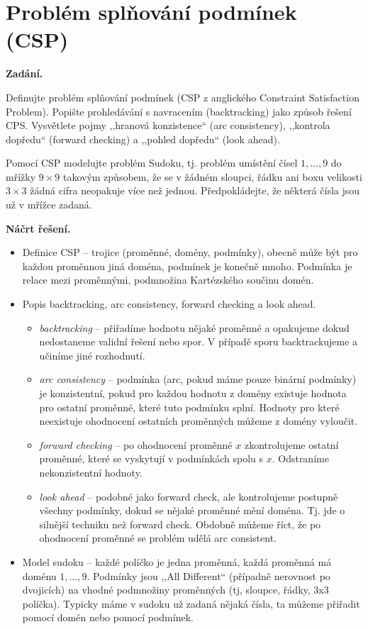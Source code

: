 \section{Problém splňování podmínek (CSP)}

\noindent\textbf{Zadání.}\par
Definujte problém splňování podmínek (CSP z anglického Constraint Satisfaction Problem). Popište prohledávání s navracením (backtracking) jako způsob řešení CPS. Vysvětlete pojmy ,,hranová konzistence`` (arc consistency), ,,kontrola dopředu`` (forward checking) a ,,pohled dopředu`` (look ahead).

Pomocí CSP modelujte problém Sudoku, tj. problém umístění čísel $1, \dots, 9$ do mřížky $9 \times 9$ takovým způsobem, že se v žádném sloupci, řádku ani boxu velikosti $3 \times 3$ žádná cifra neopakuje více než jednou. Předpokládejte, že některá čísla jsou už v mřížce zadaná.

\medskip
\noindent\textbf{Náčrt řešení.}\par
\begin{itemize}[nosep]
  \item Definice CSP -- trojice (proměnné, domény, podmínky), obecně může být pro každou proměnnou jiná doména, podmínek je konečně mnoho. Podmínka je relace mezi proměnnými, podmnožina Kartézského součinu domén.
  \item Popis backtracking, arc consistency, forward checking a look ahead.
  \begin{itemize}[nosep]
    \item \textit{backtracking} -- přiřadíme hodnotu nějaké proměnné a opakujeme dokud nedostaneme validní řešení nebo spor. V případě sporu backtrackujeme a učiníme jiné rozhodnutí.
    \item \textit{arc consistency} -- podmínka (arc, pokud máme pouze binární podmínky) je konzistentní, pokud pro každou hodnotu z domény existuje hodnota pro ostatní proměnné, které tuto podmínku splní. Hodnoty pro které neexistuje ohodnocení ostatních proměnných můžeme z domény vyloučit.
    \item \textit{forward checking} -- po ohodnocení proměnné $x$ zkontrolujeme ostatní proměnné, které se vyskytují v podmínkách spolu s $x$. Odstraníme nekonzistentní hodnoty.
    \item \textit{look ahead} -- podobné jako forward check, ale kontrolujeme postupně všechny podmínky, dokud se nějaké proměnné mění doména. Tj. jde o silnější techniku než forward check. Obdobně můžeme říct, že po ohodnocení proměnné se problém udělá arc consistent.
  \end{itemize}
  \item Model sudoku -- každé políčko je jedna proměnná, každá proměnná má doménu $1, \dots, 9$. Podmínky jsou ,,All Different`` (případně nerovnost po dvojicích) na vhodné podmnožiny proměnných (tj, sloupce, řádky, 3x3 políčka). Typicky máme v sudoku už zadaná nějaká čísla, ta můžeme přiřadit pomocí domén nebo pomocí podmínek.
\end{itemize}
